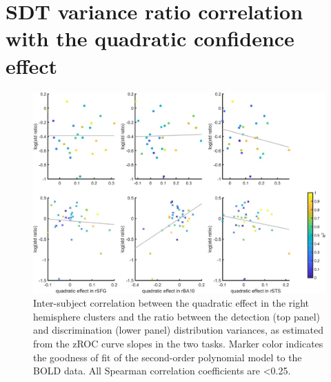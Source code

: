 \documentclass[12pt,twoside]{reedthesis}
\begin{document}
\hypertarget{app3-varianceRat}{%
\section{SDT variance ratio correlation with the quadratic confidence effect}\label{app3-varianceRat}}
\begin{figure}[H]
\includegraphics[width=\linewidth]{figure/fMRI/varianceRatio} \caption[Inter-subject correlation between the quadratic effect in the right hemisphere clusters and the ratio between the detection and discrimination distribution variances]{Inter-subject correlation between the quadratic effect in the right hemisphere clusters and the ratio between the detection (top panel) and discrimination (lower panel) distribution variances, as estimated from the zROC curve slopes in the two tasks. Marker color indicates the goodness of fit of the second-order polynomial model to the BOLD data. All Spearman correlation coefficients are <0.25.}\label{fig:varianceRat}
\end{figure}
\newpage
\end{document}
